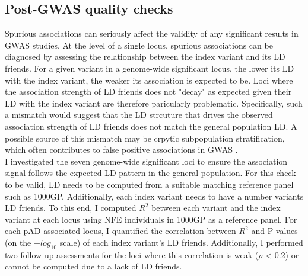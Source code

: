     \subsection{Post-GWAS quality checks}
    Spurious associations can seriously affect the validity of any significant results in GWAS studies. At the level of a single locus,  spurious associations can be diagnosed by assessing the relationship between the index variant and its LD friends. For a given variant in a genome-wide significant locus, the lower its LD with the index variant, the weaker its association is expected to be. Loci where the association strength of LD friends does not "decay" as expected given their LD with the index variant are therefore paricularly problematic. Specifically, such a mismatch would suggest that the LD strcuture that drives the observed association strength of LD friends does not match the general population LD. A possible source of this mismatch may be crpytic subpopulation stratification, which often contributes to false positive associations in GWAS \cite{Hellwege2017-xf}. \\ 
    
    I investigated the seven genome-wide significant loci to ensure the association signal follows the expected LD pattern in the general population. For this check to be valid, LD needs to be computed from a suitable matching reference panel such as 1000GP. Additionally, each index variant needs to have a number variants LD friends. To this end, I computed $R^{2}$ between each variant and the index variant at each locus using NFE individuals in 1000GP as a reference panel. For each pAD-associated locus, I quantified the correlation between $R^{2}$ and P-values (on the $-log_{10}$ scale) of each index variant's LD friends. Additionally, I performed two follow-up assessments for the loci where this correlation is weak ($\rho$ < 0.2) or cannot be computed due to a lack of LD friends. \\

    
    
